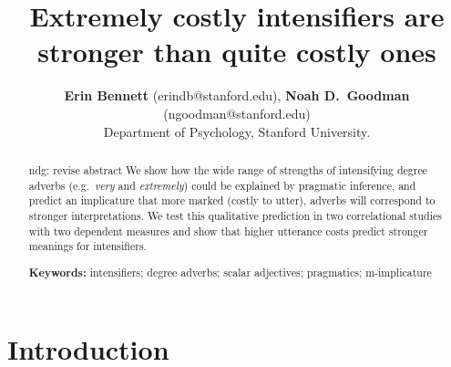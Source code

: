 \documentclass[10pt,letterpaper]{article}
\title{Extremely costly intensifiers are stronger than quite costly ones}
\author{{\large \bf Erin Bennett} (erindb@stanford.edu), {\large \bf Noah D.~Goodman} (ngoodman@stanford.edu)\\
  Department of Psychology, Stanford University.}
\newcommand{\w}[1]{\emph{#1}}
\newcommand{\todo}[1]{{\color{red}#1}}
\begin{document}
\maketitle

\begin{abstract}

\todo{ndg: revise abstract}
We show how the wide range of strengths of intensifying degree adverbs (e.g.~\w{very} and \w{extremely}) could be explained by pragmatic inference, and predict an implicature that more marked (costly to utter), adverbs will correspond to stronger interpretations. We test this qualitative prediction in two correlational studies with two dependent measures and show that higher utterance costs predict stronger meanings for intensifiers.

\textbf{Keywords:} 
intensifiers; degree adverbs; scalar adjectives; pragmatics; m-implicature
\end{abstract}

\section{Introduction}
\end{document}

